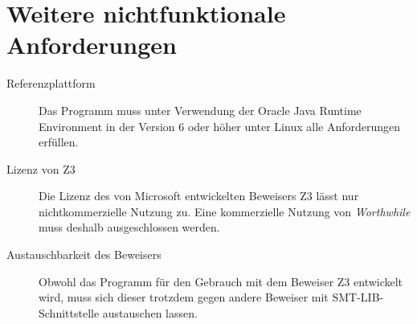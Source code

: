 \section{Weitere nichtfunktionale Anforderungen}%

\begin{description}%
    \item [Referenzplattform] Das Programm muss unter Verwendung der Oracle Java Runtime Environment in der Version 6 oder höher unter Linux alle Anforderungen erfüllen.
    \item [Lizenz von Z3] Die Lizenz des von Microsoft entwickelten Beweisers Z3 lässt nur nichtkommerzielle Nutzung zu. Eine kommerzielle Nutzung von \emph{Worthwhile} muss deshalb ausgeschlossen werden.
    \item [Austauschbarkeit des Beweisers] Obwohl das Programm für den Gebrauch mit dem Beweiser Z3 entwickelt wird, muss sich dieser trotzdem gegen andere Beweiser mit SMT-LIB-Schnittstelle austauschen lassen.
\end{description}
